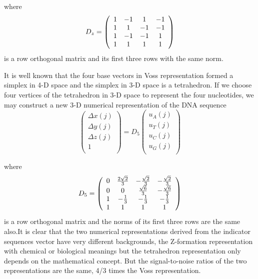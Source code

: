\documentclass[preprint,authoryear,12pt]{elsarticle}
\begin{document}
where   $$D_z  = \left( {\begin{array}{*{20}c}
   1 & { - 1} & 1 & { - 1}  \\
   1 & 1 & { - 1} & { - 1}  \\
   1 & { - 1} & { - 1} & 1  \\
   1 & 1 & 1 & 1  \\
\end{array}} \right)$$  is a row orthogonal matrix and its first three rows with the same norm.

It is well known that the four base vectors in Voss representation \citep{VOSS1993} formed a simplex in 4-D space and the simplex in 3-D space is a tetrahedron\citep{SILVERMAN1986}. If we choose four vertices of the tetrahedron in 3-D space to represent the four nucleotides, we may construct a new 3-D numerical representation of the DNA sequence
$$\left( \begin{array}{l}
 \Delta x(j) \\
 \Delta y(j) \\
 \Delta z(j) \\
 1 \\
 \end{array} \right) = D_5 \left( \begin{array}{l}
 u_A (j) \\
 u_T (j) \\
 u_C (j) \\
 u_G (j) \\
 \end{array} \right)
$$

where
$$
D_5 = \left( {\begin{array}{*{20}c}
   0 & {\frac{{2\sqrt 2 }}{3}} & { - \frac{{\sqrt 2 }}{3}} & { - \frac{{\sqrt 2 }}{3}}  \\
   0 & 0 & {\frac{{\sqrt 6 }}{3}} & { - \frac{{\sqrt 6 }}{3}}  \\
   1 & { - \frac{1}{3}} & { - \frac{1}{3}} & { - \frac{1}{3}}  \\
   1 & 1 & 1 & 1  \\
\end{array}} \right)
$$
is a row orthogonal matrix and the norms of its first three rows are the same also.It is clear that the two numerical representations derived from the indicator sequences vector have very different backgrounds, the Z-formation representation with chemical or biological meanings but the tetrahedron representation \citep{SILVERMAN1986} only depends on the mathematical concept. But the signal-to-noise ratios of the two representations are the same, 4/3 times the Voss representation.
\end{document}
